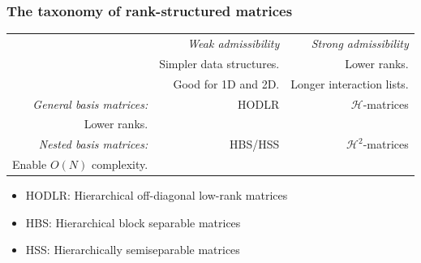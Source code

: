 \documentclass[10pt,final,xcolor=dvipsnames]{beamer}
\newcommand{\Hm}{\mathcal{H}}
\begin{document}
%
%
\begin{frame}
  \frametitle{The taxonomy of rank-structured matrices}

  \begin{table}
    \begin{center}

      \label{tbl:performance}
      \begin{tabular}{|r|r|r|}
        \hline
        & {\it Weak admissibility}       & {\it Strong admissibility}  \\
        & Simpler data structures. & Lower ranks.\\
        & Good for 1D and 2D.      & Longer interaction lists. \\
        \hline
            {\it General basis matrices:}     & HODLR              & $\Hm$-matrices  \\
            Lower ranks.               &                    & \\
            \hline
                {\it Nested basis matrices:}      & HBS/HSS                & $\Hm^2$-matrices \\
                Enable $O(N)$ complexity.  &                    &\\
                \hline
      \end{tabular}
    \end{center}
  \end{table}

  \vspace{0.1in}
  \small
  \vspace{0.02in}
  \begin{itemize}
  \item HODLR: Hierarchical off-diagonal low-rank matrices
  \item HBS: Hierarchical block separable matrices
  \item HSS: Hierarchically semiseparable matrices


\end{itemize}
\end{frame}
\end{document}
